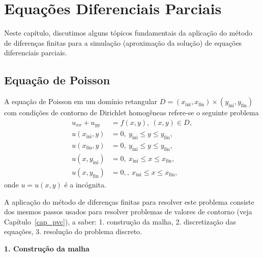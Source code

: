
\chapter{Equações Diferenciais Parciais}\label{cap_edp}
\thispagestyle{fancy}

Neste capítulo, discutimos alguns tópicos fundamentais da aplicação do método de diferenças finitas para a simulação (aproximação da solução) de equações diferenciais parciais.

\section{Equação de Poisson}\label{cap_edp_sec_Poisson}

A equação de Poisson em um domínio retangular $D = (x_{\text{ini}}, x_{\text{fin}})\times (y_{\text{ini}}, y_{\text{fin}})$ com condições de contorno de Dirichlet homogêneas refere-se o seguinte problema
\begin{align}
  u_{xx} + u_{yy} &= f(x, y),~(x, y)\in D, \label{eq:edp_Poisson_eq}\\
  u(x_{\text{ini}}, y) &= 0,~y_{\text{ini}}\leq y \leq y_{\text{fin}},\label{eq:edp_Poisson_bcxini}\\
  u(x_{\text{fin}}, y) &= 0,~y_{\text{ini}}\leq y \leq y_{\text{fin}},\label{eq:edp_Poisson_bcxfin}\\
  u(x, y_{\text{ini}}) &= 0,~x_{\text{ini}}\leq x \leq x_{\text{fin}},\label{eq:edp_Poisson_bcyini}\\
  u(x, y_{\text{fin}}) &= 0,,~x_{\text{ini}}\leq x \leq x_{\text{fin}},\label{eq:edp_Poisson_bcyfin}
\end{align}
onde $u = u(x,y)$ é a incógnita.

A aplicação do método de diferenças finitas para resolver este problema consiste dos mesmos passos usados para resolver problemas de valores de contorno (veja Capítulo~\ref{cap_pvc}), a saber: 1. construção da malha, 2. discretização das equações, 3. resolução do problema discreto.

\begin{flushleft}
  {\bf 1. Construção da malha}
\end{flushleft}

